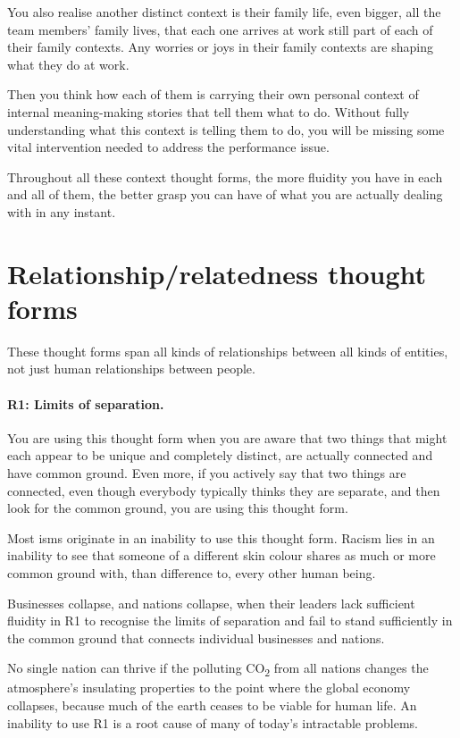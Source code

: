 You also realise another distinct context is their family life, even bigger, all the team members’ family lives, that each one arrives at work still part of each of their family contexts. Any worries or joys in their family contexts are shaping what they do at work.


Then you think how each of them is carrying their own personal context of internal meaning-making stories that tell them what to do. Without fully understanding what this context is telling them to do, you will be missing some vital intervention needed to address the performance issue.


Throughout all these context thought forms, the more fluidity you have in each and all of them, the better grasp you can have of what you are actually dealing with in any instant.






\section{Relationship/relatedness thought forms}
These thought forms span all kinds of relationships between all kinds of entities, not just human relationships between people. 


\paragraph{\textbf{R1: Limits of separation.}}
You are using this thought form when you are aware that two things that might each appear to be unique and completely distinct, are actually connected and have common ground. Even more, if you actively say that two things are connected, even though everybody typically thinks they are separate, and then look for the common ground, you are using this thought form.


Most isms originate in an inability to use this thought form. Racism lies in an inability to see that someone of a different skin colour shares as much or more common ground with, than difference to, every other human being. 


Businesses collapse, and nations collapse, when their leaders lack sufficient fluidity in R1 to recognise the limits of separation and fail to stand sufficiently in the common ground that connects individual businesses and nations. 


No single nation can thrive if the polluting CO\textsubscript{2} from all nations changes the atmosphere's insulating properties to the point where the global economy collapses, because much of the earth ceases to be viable for human life. An inability to use R1 is a root cause of many of today's intractable problems. 
